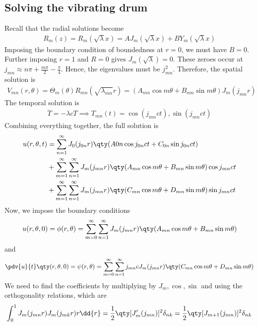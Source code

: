 \subsection{Solving the vibrating drum}
Recall that the radial solutions become
\begin{align*}
	R_m(z) = R_m(\sqrt{\lambda} x) = A J_m(\sqrt{\lambda} x) + B Y_m(\sqrt{\lambda} x)
\end{align*}
Imposing the boundary condition of boundedness at $r = 0$, we must have $B = 0$.
Further imposing $r = 1$ and $R = 0$ gives $J_m(\sqrt{\lambda}) = 0$.
These zeroes occur at $j_{mn} \approx n \pi + \frac{m \pi}{2} - \frac{\pi}{4}$.
Hence, the eigenvalues must be $j^2_{mn}$.
Therefore, the spatial solution is
\begin{align*}
	V_{mn}(r, \theta) = \Theta_m(\theta) R_{mn}(\sqrt{\lambda_{mn}} r) = (A_{mn} \cos m \theta + B_{mn} \sin m \theta) J_m (j_{mn} r)
\end{align*}
The temporal solution is
\begin{align*}
	\ddot T = -\lambda c T \implies T_{mn}(t) = \cos(j_{mn} ct), \sin(j_{mn} ct)
\end{align*}
Combining everything together, the full solution is
\begin{align*}
	u(r,\theta,t) & = \sum_{n=1}^\infty J_0(j_{0n} r) \qty( A{0n}\cos j_{0n}ct + C_{0n}\sin j_{0n}ct )                                    \\
	              & + \sum_{m=1}^\infty \sum_{n=1}^\infty J_m (j_{mn}r) \qty( A_{mn} \cos m \theta + B_{mn} \sin m\theta ) \cos j_{mn} ct \\
	              & + \sum_{m=1}^\infty \sum_{n=1}^\infty J_m (j_{mn}r) \qty( C_{mn} \cos m \theta + D_{mn} \sin m\theta ) \sin j_{mn} ct
\end{align*}
Now, we impose the boundary conditions
\begin{align*}
	u(r,\theta,0) = \phi(r,\theta) = \sum_{m=0}^\infty \sum_{n=1}^\infty J_m (j_{mn}r) \qty( A_{mn} \cos m \theta + B_{mn} \sin m\theta )
\end{align*}
and
\begin{align*}
	\pdv{u}{t}\qty(r,\theta,0) = \psi(r,\theta) = \sum_{m=0}^\infty \sum_{n=1}^\infty j_{mn} c J_m (j_{mn}r) \qty( C_{mn} \cos m \theta + D_{mn} \sin m\theta )
\end{align*}
We need to find the coefficients by multiplying by $J_m, \cos, \sin$ and using the orthogonality relations, which are
\begin{align*}
	\int_0^1 J_m(j_{mn} r) J_m(j_{mk} r) r \dd{r} = \frac{1}{2}\qty[J_m'(j_{mn})]^2 \delta_{nk} = \frac{1}{2}\qty[J_{m+1}(j_{mn})]^2 \delta_{nk}
\end{align*}
